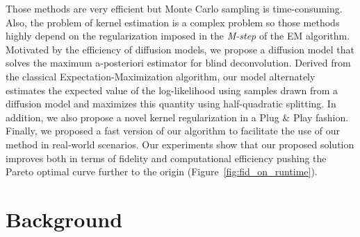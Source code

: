 \documentclass[10pt,twocolumn,letterpaper]{article}
\begin{document}
Those methods are very efficient but Monte Carlo sampling is time-consuming. Also, the problem of kernel estimation is a complex problem so those methods highly depend on the regularization imposed in the \textit{M-step} of the EM algorithm.
%
\newline
\newline
Motivated by the efficiency of diffusion models, we propose a diffusion model that solves the maximum a-posteriori estimator for blind deconvolution. Derived from the classical Expectation-Maximization algorithm, our model alternately estimates the expected value of the log-likelihood using samples drawn from a diffusion model and maximizes this quantity using half-quadratic splitting. In addition, we also propose a novel kernel regularization in a Plug \& Play fashion. Finally, we proposed a fast version of our algorithm to facilitate the use of our method in real-world scenarios. Our experiments show that our proposed solution improves both in terms of fidelity and computational efficiency pushing the Pareto optimal curve further to the origin (Figure~\ref{fig:fid_on_runtime}).
%


\section{Background}
\end{document}
